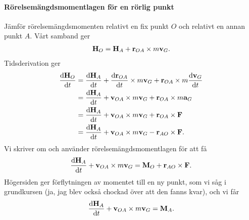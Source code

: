 \paragraph{Rörelsemängdsmomentlagen för en rörlig punkt}
Jämför rörelsemängdsmomenten relativt en fix punkt $O$ och relativt en annan punkt $A$. Vårt samband ger
\begin{align*}
	\vb{H}_{O} = \vb{H}_{A} + \vb{r}_{OA}\times m\vb{v}_{G}.
\end{align*}
Tidsderivation ger
\begin{align*}
	\dv{\vb{H}_{O}}{t} &= \dv{\vb{H}_{A}}{t} + \dv{\vb{r}_{OA}}{t}\times m\vb{v}_{G} + \vb{r}_{OA}\times m\dv{\vb{v}_{G}}{t} \\
	                   &= \dv{\vb{H}_{A}}{t} + \vb{v}_{OA}\times m\vb{v}_{G} + \vb{r}_{OA}\times m\vb{a}_{G} \\
	                   &= \dv{\vb{H}_{A}}{t} + \vb{v}_{OA}\times m\vb{v}_{G} + \vb{r}_{OA}\times\vb{F} \\
	                   &= \dv{\vb{H}_{A}}{t} + \vb{v}_{OA}\times m\vb{v}_{G} - \vb{r}_{AO}\times\vb{F}.
\end{align*}
Vi skriver om och använder rörelsemängdsmomentlagen för att få
\begin{align*}
	\dv{\vb{H}_{A}}{t} + \vb{v}_{OA}\times m\vb{v}_{G} = \vb{M}_{O} + \vb{r}_{AO}\times\vb{F}.
\end{align*}
Högersiden ger förflytningen av momentet till en ny punkt, som vi såg i grundkursen (ja, jag blev också chockad över att den fanns kvar), och vi får
\begin{align*}
	\dv{\vb{H}_{A}}{t} + \vb{v}_{OA}\times m\vb{v}_{G} = \vb{M}_{A}.
\end{align*}